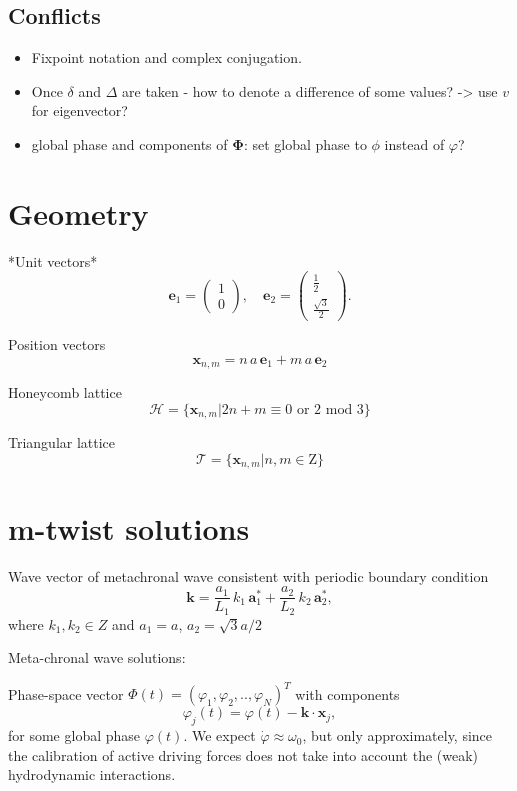 \documentclass[a4paper,10pt]{article}
\newcommand*{\D}{\Delta}%
\begin{document}
\subsection{Conflicts}

\begin{itemize}

\item Fixpoint notation and complex conjugation.
\item Once $\delta$ and $\D$ are taken - how to denote a difference of some values? -> use $v$ for eigenvector?
\item global phase and components of $\mathbf{\Phi}$: set global phase to $\phi$ instead of $\varphi$?
\end{itemize}


\section{Geometry}

*Unit vectors*
$$
\mathbf{e}_1 =\left( \begin{array}{c} 1 \\ 0 \end{array} \right), \quad
\mathbf{e}_2 =\left( \begin{array}{c} \frac{1}{2} \\  \frac{\sqrt{3}}{2} \end{array} \right).
$$

Position vectors
$$
\mathbf{x}_{n,m} = n\,a\,\mathbf{e}_1 +  m\,a\,\mathbf{e}_2
$$

Honeycomb lattice
$$
\mathcal{H} = \{ \mathbf{x}_{n,m} | 2n+m \equiv 0 \text{ or } 2 \text{ mod } 3\}
$$

Triangular lattice
$$
\mathcal{T} = \{ \mathbf{x}_{n,m} | n,m \in \mathrm{Z} \}
$$

\section{m-twist solutions}

Wave vector of metachronal wave consistent with periodic boundary condition
$$ \mathbf{k} = \frac{a_1}{L_1}\,k_1\,\mathbf{a}_1^* + \frac{a_2}{L_2}\,k_2\,\mathbf{a}_2^*, $$
where $k_1,k_2\in{Z}$ and $a_1=a$, $a_2 = \sqrt{3} a/2$

Meta-chronal wave solutions:

Phase-space vector
$ \Phi (t) = (\varphi_1, \varphi_2, .., \varphi_{N})^T $
with components
$$
\varphi_j(t) = \varphi(t) - \mathbf{k} \cdot \mathbf{x}_j,
$$
for some global phase $\varphi(t)$.
We expect $\dot{\varphi}\approx\omega_0$, but only approximately, since the calibration of active driving forces does not take into account the (weak) hydrodynamic interactions.
\end{document}

